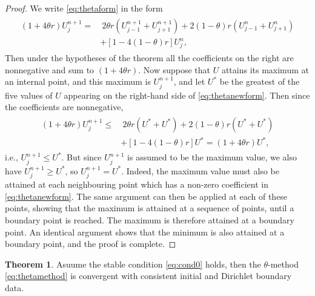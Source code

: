 \documentclass[a4paper,twoside]{ctexart}
\theoremstyle{definition}
\newtheorem{theorem}[definition]{Theorem}
\begin{document}
\begin{proof}
	We write \eqref{eq:thetaform} in the form
	\begin{eqnarray}
	\label{eq:thetanewform}
	\begin{aligned}
	 (1 + 4\theta r)U_{j}^{n+1} 
	=&\ 2\theta r (U_{j-1}^{n+1}+U_{j+1}^{n+1})+2(1-\theta)r(U_{j-1}^{n}+U_{j+1}^{n})\\
	&+[1-4(1-\theta)r]U_{j}^{n},
	\end{aligned}
	\end{eqnarray}
	Then under the hypotheses of the theorem all the coefficients on the right
	are nonnegative and sum to $(1 + 4\theta r)$. Now suppose that $U$ attains its maximum at an internal point, and this maximum is $U_j^{n+1}$, and let $U^*$ be the greatest of the five values of $U$ appearing on the right-hand side of \eqref{eq:thetanewform}. Then since the coefficients are nonnegative,
	\begin{eqnarray}
	\begin{aligned}
	(1 + 4\theta r)U_{j}^{n+1} 
	\le&\ 2\theta r (U^*+U^*)+2(1-\theta)r(U^*+U^*)\\
	&+[1-4(1-\theta)r]U^* = (1 + 4\theta r)U^*, 
	\end{aligned}
	\end{eqnarray}
	i.e., $U_{j}^{n+1} \le U^*$. But since
	$U_{j}^{n+1}$ is assumed to be the maximum value, we also have $U_{j}^{n+1} \ge U^*$, so $U_{j}^{n+1} = U^*$.  Indeed, the maximum value must also be attained at each
	neighbouring point which has a non-zero coefficient in \eqref{eq:thetanewform}. The same
	argument can then be applied at each of these points, showing that the
	maximum is attained at a sequence of points, until a boundary point
	is reached. The maximum is therefore attained at a boundary point.
	An identical argument shows that the minimum is also attained at a
	boundary point, and the proof is complete.
\end{proof}
\begin{theorem}
	Asuume the stable condition \eqref{eq:cond0} holds, then the $\theta$-method \eqref{eq:thetamethod} is convergent with consistent initial and
	Dirichlet boundary data.
\end{theorem}
\end{document}
